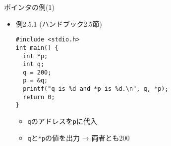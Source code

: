 \begin{frame}[t,fragile]{ポインタの例(1)}
  \begin{itemize}
  \item 例2.5.1 (ハンドブック2.5節)
\begin{lstlisting}
#include <stdio.h>
int main() {
  int *p;
  int q;
  q = 200;
  p = &q;
  printf("q is %d and *p is %d.\n", q, *p);
  return 0;
}
\end{lstlisting}
\begin{itemize}
\item \verb+q+のアドレスを\verb+p+に代入
\item \verb+q+と\verb+*p+の値を出力 → 両者とも200
\end{itemize}
  \end{itemize}
\end{frame}
